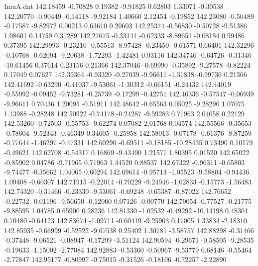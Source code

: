 \begin{filecontents}{ImuA.dat}
 142.18459   -0.70828    0.19382   -9.91825    0.62803    1.33071   -0.30538
 142.20770   -0.90449   -0.14118   -9.92184    1.40660    2.12454   -0.19852
 142.23080   -0.50489   -0.17587   -9.82972    0.00213    0.63610    0.20603
 142.25374   -0.56830   -0.50728   -9.51386    1.08601    0.14759    0.31289
 142.27675   -0.33141   -0.62333   -8.89651   -0.08184    0.99486    0.37395
 142.29993   -0.23210   -0.55513   -8.97428   -0.23450   -0.61571    0.66401
 142.32296   -0.10768   -0.62094   -9.20638   -1.72293   -1.42481    0.93116
 142.34746   -0.64726   -0.31346  -10.61456    0.37614    0.23156    0.21366
 142.37046   -0.69990   -0.35892   -9.27578   -0.82224    0.17049    0.07627
 142.39364   -0.93320   -0.27039   -9.96611   -1.31838   -0.99736    0.21366
 142.41692   -0.63290   -0.41037   -9.53061   -1.30312   -0.66151   -0.24432
 142.44019   -0.55992   -0.09452   -9.73281   -0.25739   -0.17299   -0.42751
 142.46336   -0.57547   -0.06939   -9.96611    0.70436    1.20095   -0.51911
 142.48642   -0.65563    0.05025   -9.28296    1.07075    1.13988   -0.28248
 142.50922   -0.74178   -0.24287   -9.59283    0.71963    2.04058    0.22129
 142.53260   -0.72503   -0.55753   -9.62274    0.07082    2.01768    0.04574
 142.55566   -0.35653   -0.78604   -9.52343   -0.46349    0.34605   -0.25958
 142.58013   -0.07178   -0.61376   -8.87259   -0.77644   -1.46297   -0.47331
 142.60290   -0.69511   -0.18185  -10.28435    0.73490    0.10179   -0.49621
 142.62708   -0.54317    0.16869   -9.43490    1.21577    1.80395    0.01520
 142.65022   -0.85902    0.04786   -9.71965    0.71963    1.44520    0.88537
 142.67322   -0.96311   -0.65803   -9.74477   -0.35662    1.04065    0.60294
 142.69614   -0.95713   -1.05523   -9.58804   -0.94436    1.09408   -0.60307
 142.71915   -0.22014   -0.70229   -9.24946   -1.02833   -0.15773   -1.56483
 142.74320   -0.31466   -0.23330   -9.53061   -0.69248   -0.65387   -0.87022
 142.76652   -0.22732   -0.01196   -9.56650   -0.12000    0.07126   -0.00770
 142.79054   -0.77527   -0.21775   -9.88595    1.04785    0.65900    0.28236
 142.81330   -1.02532   -0.49292  -10.14198    0.48301    0.70480   -0.64123
 142.83674   -1.09711   -0.60419   -9.25903    0.17005    1.33834   -2.18310
 142.85935   -0.66999   -0.52522   -9.67538    0.25402    1.30781   -3.58757
 142.88298   -0.31466   -0.37448   -9.06521   -0.08947   -0.17299   -3.51124
 142.90594   -0.29671   -0.58505   -9.28535   -0.19633   -1.15002   -2.77084
 142.92883   -0.53360   -0.50967   -9.53779    0.68146   -0.55464   -2.77847
 142.95177   -0.80997   -0.75015   -9.31526   -0.18106   -0.72257   -2.22890

\end{filecontents}
